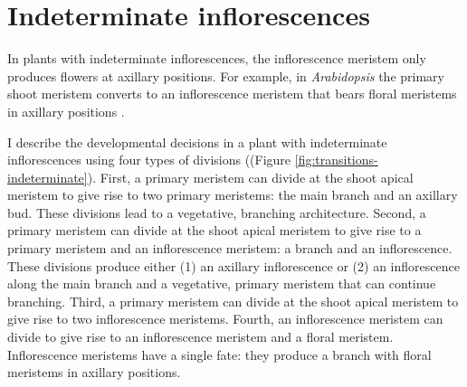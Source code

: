 \documentclass[12pt, oneside]{article}   	%
\begin{document}
\section{Indeterminate inflorescences}

In plants with indeterminate inflorescences, the inflorescence meristem only produces flowers at axillary positions. For example, in \textit{Arabidopsis} the primary shoot meristem converts to an inflorescence meristem that bears floral meristems in axillary positions \cite{bradley1997a}.

I describe the developmental decisions in a plant with indeterminate inflorescences using four types of divisions ((Figure \ref{fig:transitions-indeterminate}). First, a primary meristem can divide at the shoot apical meristem to give rise to two primary meristems: the main branch and an axillary bud. These divisions lead to a vegetative, branching architecture. Second, a primary meristem can divide at the shoot apical meristem to give rise to a primary meristem and an inflorescence meristem: a branch and an inflorescence. These divisions  produce either (1) an axillary inflorescence or (2) an inflorescence along the main branch and a vegetative, primary meristem that can continue branching. Third, a primary meristem can divide at the shoot apical meristem to give rise to two inflorescence meristems. Fourth, an inflorescence meristem can divide to give rise to an inflorescence meristem and a floral meristem. Inflorescence meristems have a single fate: they produce a branch with floral meristems in axillary positions.
\end{document}
